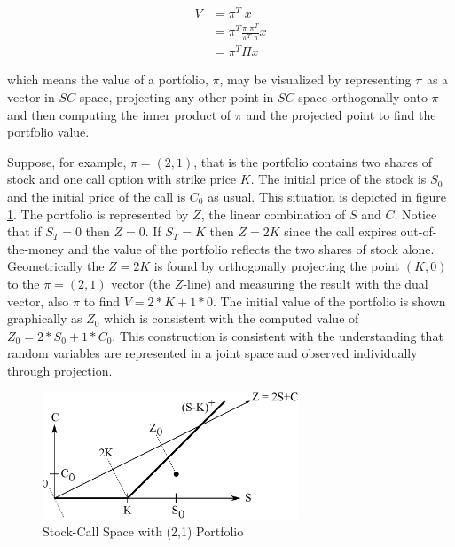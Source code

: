 \begin{align*}
V &= \pi^T\;x\\
  &= \pi^T \frac{\pi\;\pi^T}{\pi^T\;\pi} x\\
  &= \pi^T \Pi x
\end{align*}

which means the value of a portfolio, $\pi$, may be visualized by representing $\pi$ as a vector in $SC$-space, projecting any other point in $SC$ space orthogonally onto $\pi$ and then computing the inner product of $\pi$ and the projected point to find the portfolio value. 

Suppose, for example, $\pi = (2,1)$, that is the portfolio contains two shares of stock and one call option with strike price $K$. The initial price of the stock is $S_0$ and the initial price of the call is $C_0$ as usual. This situation is depicted in figure \ref{fig:SC_21}. The portfolio is represented by $Z$, the linear combination of $S$ and $C$. Notice that if $S_T = 0$ then $Z = 0$. If $S_T = K$ then $Z = 2K$ since the call expires out-of-the-money and the value of the portfolio reflects the two shares of stock alone. Geometrically the $Z=2K$ is found by orthogonally projecting the point $(K,0)$ to the $\pi = (2,1)$ vector (the $Z$-line) and measuring the result with the dual vector, also $\pi$ to find $V = 2*K + 1*0$. The initial value of the portfolio is shown graphically as $Z_0$ which is consistent with the computed value of $Z_0 = 2*S_0 + 1*C_0$. This construction is consistent with the understanding that random variables are represented in a joint space and observed individually through projection. 

\begin{figure}
  \centering
  \includegraphics[width=3in]{Images/SC_21.eps}
  \caption[Stock-Call Space with (2,1) Portfolio]
          {Stock-Call Space with (2,1) Portfolio}
  \label{fig:SC_21}
\end{figure}

